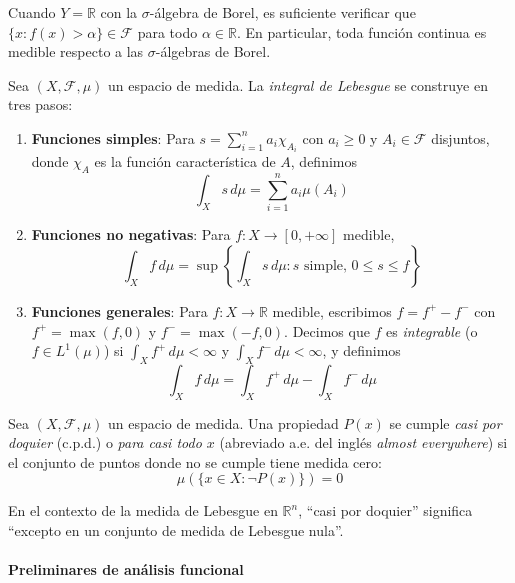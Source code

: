 Cuando $Y = \mathbb{R}$ con la $\sigma$-álgebra de Borel, es suficiente verificar que $\{x : f(x) > \alpha\} \in \mathcal{F}$ para todo $\alpha \in \mathbb{R}$. En particular, toda función continua es medible respecto a las $\sigma$-álgebras de Borel.

\begin{definition}\label{def:integral_lebesgue}
	Sea $(X, \mathcal{F}, \mu)$ un espacio de medida. La \textit{integral de Lebesgue} se construye en tres pasos:
	\begin{enumerate}
		\item \textbf{Funciones simples}: Para $s = \sum_{i=1}^n a_i \chi_{A_i}$ con $a_i \geq 0$ y $A_i \in \mathcal{F}$ disjuntos, donde $\chi_{A}$ es la función característica de $A$, definimos
		\[
			\int_X s \, d\mu = \sum_{i=1}^n a_i \mu(A_i)
		\]
		\item \textbf{Funciones no negativas}: Para $f: X \to [0, +\infty]$ medible,
		\[
			\int_X f \, d\mu = \sup\left\{\int_X s \, d\mu : s \text{ simple, } 0 \leq s \leq f\right\}
		\]
		\item \textbf{Funciones generales}: Para $f: X \to \mathbb{R}$ medible, escribimos $f = f^+ - f^-$ con $f^+ = \max(f, 0)$ y $f^- = \max(-f, 0)$. Decimos que $f$ es \textit{integrable} (o $f \in L^1(\mu)$) si $\int_X f^+ \, d\mu < \infty$ y $\int_X f^- \, d\mu < \infty$, y definimos
		\[
			\int_X f \, d\mu = \int_X f^+ \, d\mu - \int_X f^- \, d\mu
		\]
	\end{enumerate}
\end{definition}

\begin{definition}\label{def:casi_por_doquier}
	Sea $(X, \mathcal{F}, \mu)$ un espacio de medida. Una propiedad $P(x)$ se cumple \textit{casi por doquier} (c.p.d.) o \textit{para casi todo $x$} (abreviado a.e. del inglés \textit{almost everywhere}) si el conjunto de puntos donde no se cumple tiene medida cero:
	\[
		\mu(\{x \in X : \neg P(x)\}) = 0
	\]
\end{definition}

En el contexto de la medida de Lebesgue en $\mathbb{R}^n$, ``casi por doquier'' significa ``excepto en un conjunto de medida de Lebesgue nula''.

\paragraph{Preliminares de análisis funcional}

